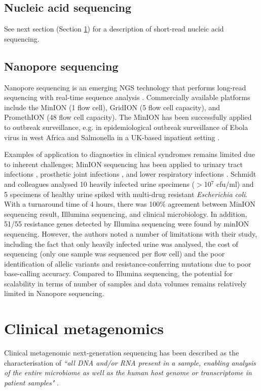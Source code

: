 \subsection{Nucleic acid sequencing}
See next section (Section \ref{sec:clinmetagenomics}) for a description of short-read nucleic acid sequencing.

\subsection{Nanopore sequencing}
Nanopore sequencing is an emerging NGS technology that performs long-read sequencing with real-time sequence analysis \parencite{Jain2016}. Commercially available platforms include the MinION (1 flow cell), GridION (5 flow cell capacity), and PromethION (48 flow cell capacity). The MinION has been successfully applied to outbreak surveillance, e.g. in epidemiological outbreak surveillance of Ebola virus in west Africa \parencite{Quick2016} and Salmonella in a UK-based inpatient setting \parencite{Quick2015}.

Examples of application to diagnostics in clinical syndromes remains limited due to inherent challenges; MinION sequencing has been applied to urinary tract infections \parencite{Schmidt2017}, prosthetic joint infections \parencite{Sanderson2018}, and lower respiratory infections \parencite{Charalampous2019}. Schmidt and colleagues \parencite{Schmidt2017} analysed 10 heavily infected urine specimens ($>$10$^7$ cfu/ml) and 5 specimens of healthy urine spiked with multi-drug resistant \textit{Escherichia coli}. With a turnaround time of 4 hours, there was 100\% agreement between MinION sequencing result, Illlumina sequencing, and clinical microbiology. In addition, 51/55 resistance genes detected by Illumina sequencing were found by minION sequencing. However, the authors noted a number of limitations with their study, including the fact that only heavily infected urine was analysed, the cost of sequencing (only one sample was sequenced per flow cell) and the poor identification of allelic variants and resistance-conferring mutations due to poor base-calling accuracy. Compared to Illumina sequencing, the potential for scalability in terms of number of samples and data volumes remains relatively limited in Nanopore sequencing.  

\section{Clinical metagenomics} \label{sec:clinmetagenomics}
Clinical metagenomic next-generation sequencing has been described as the characterisation of \textit{``all DNA and/or RNA present in a sample, enabling analysis of the entire microbiome as well as the human host genome or transcriptome in patient samples"} \parencite{Chiu2019}. 


